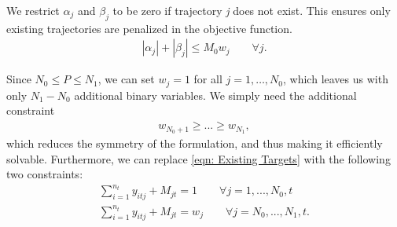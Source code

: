 We restrict $\alpha_{j}$ and $\beta_{j}$ to be zero if trajectory \textit{j} does not exist. This ensures only existing trajectories are penalized in the objective function. 
\begin{align}
|\alpha_{j}|+|\beta_{j}| \leq M_{0}w_{j}\qquad \forall j.
\end{align}

Since $N_{0} \leq P \leq N_{1}$, we can set $w_j=1$ for all $j=1,\ldots,N_0$, which leaves us with only $N_1-N_0$ additional binary variables. We simply need the additional constraint
\begin{align}
w_{N_0+1}\geq ...\geq w_{N_1},
\end{align}
which reduces the symmetry of the formulation, and thus making it efficiently solvable. Furthermore, we can replace \eqref{eqn: Existing Targets} with the following two constraints:
\begin{align}
	\sum_{i=1}^{n_{t}} y_{itj} + M_{jt} = 1 \qquad \forall j=1,...,N_{0},t\\
	\sum_{i=1}^{n_{t}} y_{itj} + M_{jt} = w_{j} \qquad \forall j=N_{0},...,N_{1},t.
\end{align}


